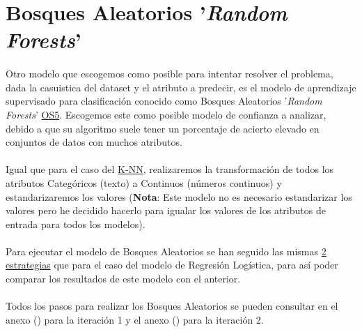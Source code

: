 \section{Bosques Aleatorios '\textit{Random Forests}'}
\label{section:rf}

\paragraph{}
Otro modelo que escogemos como posible para intentar resolver el problema, dada la casuistica del dataset y el atributo a predecir, es el modelo de aprendizaje supervisado para clasificación conocido como Bosques Aleatorios '\textit{Random Forests}'\cite{ref:rf_def} \hyperref[os:OS5]{OS5}. Escogemos este como posible modelo de confianza a analizar, debido a que su algoritmo suele tener un porcentaje de acierto elevado en conjuntos de datos con muchos atributos.

\paragraph{}
Igual que para el caso del \hyperref[section:knn]{K-NN}, realizaremos la transformación de todos los atributos Categóricos (texto) a Continuos (números continuos) y estandarizaremos los valores (\textbf{Nota}: Este modelo no es necesario estandarizar los valores pero he decidido hacerlo para igualar los valores de los atributos de entrada para todos los modelos).

\paragraph{}
Para ejecutar el modelo de Bosques Aleatorios se han seguido las mismas \hyperref[section:lr_casos]{2 estrategias} que para el caso del modelo de Regresión Logística, para así poder comparar los resultados de este modelo con el anterior.

\paragraph{}
Todos los pasos para realizar los Bosques Aleatorios se pueden consultar en el anexo () para la iteración 1 y el anexo () para la iteración 2.
